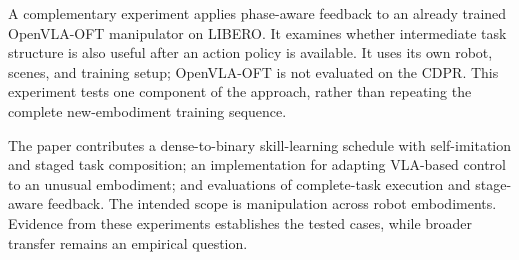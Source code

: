 A complementary experiment applies phase-aware feedback to an already trained OpenVLA-OFT manipulator on LIBERO. It examines whether intermediate task structure is also useful after an action policy is available. It uses its own robot, scenes, and training setup; OpenVLA-OFT is not evaluated on the CDPR. This experiment tests one component of the approach, rather than repeating the complete new-embodiment training sequence.

The paper contributes a dense-to-binary skill-learning schedule with self-imitation and staged task composition; an implementation for adapting VLA-based control to an unusual embodiment; and evaluations of complete-task execution and stage-aware feedback. The intended scope is manipulation across robot embodiments. Evidence from these experiments establishes the tested cases, while broader transfer remains an empirical question.
